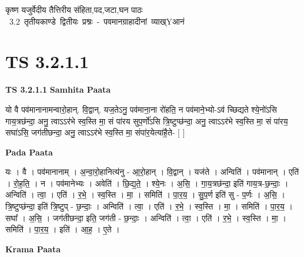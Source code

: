 \documentclass[17pt]{extarticle}
\begin{document}
\begin{titlepage}
    \begin{center}
 
\begin{sanskrit}
    { \Large
    कृष्ण यजुर्वेदीय तैत्तिरीय संहिता,पद,जटा,घन पाठः 
    }
    \\
    \vspace{2.5cm}
    \mbox{ \Large
    3.2     तृतीयकाण्डे द्वितीयः प्रश्नः - पवमानग्राहादीनां व्याख्Yआनं   }
\end{sanskrit}
\end{center}

\end{titlepage}
\tableofcontents
{}
\pagebreak


\section{ TS 3.2.1.1 }

\textbf{TS 3.2.1.1 } \newline
\textbf{Samhita Paata} \newline

यो वै पव॑मानानामन्वारो॒हान्. वि॒द्वान्. यज॒तेऽनु॒ पव॑माना॒ना रो॑हति॒ न पव॑माने॒भ्यो-ऽव॑ च्छिद्यते श्ये॒नो॑ऽसि गाय॒त्रछ॑न्दा॒ अनु॒ त्वाऽऽर॑भे स्व॒स्ति मा॒ सं पा॑रय सुप॒र्णो॑ऽसि त्रि॒ष्टुप्छ॑न्दा॒ अनु॒ त्वाऽऽर॑भे स्व॒स्ति मा॒ सं पा॑रय॒ सघा॑ऽसि॒ जग॑तीछन्दा॒ अनु॒ त्वाऽऽर॑भे स्व॒स्ति मा॒ संपा॑र॒येत्या॑है॒ते- [  ] \newline

\textbf{Pada Paata} \newline

यः । वै । पव॑मानानाम् । अ॒न्वा॒रो॒हानित्य॑नु - आ॒रो॒हान् । वि॒द्वान् । यज॑ते । अन्विति॑ । पव॑मानान् । एति॑ । रो॒ह॒ति॒ । न । पव॑मानेभ्यः । अवेति॑ । छि॒द्य॒ते॒ । श्ये॒नः । अ॒सि॒ । गा॒य॒त्रछ॑न्दा॒ इति॑ गाय॒त्र-छ॒न्दाः॒ । अन्विति॑ । त्वा॒ । एति॑ । र॒भे॒ । स्व॒स्ति । मा॒ । समिति॑ । पा॒र॒य॒ । सु॒प॒र्ण इति॑ सु - प॒र्णः । अ॒सि॒ । त्रि॒ष्टुप्छ॑न्दा॒ इति॑ त्रि॒ष्टुप् - छ॒न्दाः॒ । अन्विति॑ । त्वा॒ । एति॑ । र॒भे॒ । स्व॒स्ति । मा॒ । समिति॑ । पा॒र॒य॒ । सघा᳚ । अ॒सि॒ । जग॑तीछन्दा॒ इति॒ जग॑ती - छ॒न्दाः॒ । अन्विति॑ । त्वा॒ । एति॑ । र॒भे॒ । स्व॒स्ति । मा॒ । समिति॑ । पा॒र॒य॒ । इति॑ । आ॒ह॒ । ए॒ते ।  \newline


\textbf{Krama Paata} \newline
\end{document}
